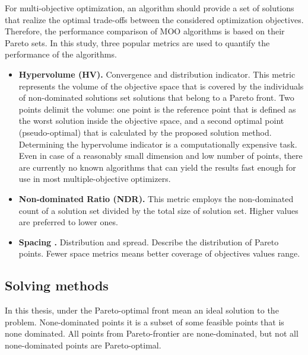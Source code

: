         For multi-objective optimization, an algorithm should provide a set of solutions that realize the optimal trade-offs between the considered optimization objectives. Therefore, the performance comparison of MOO algorithms is based on their Pareto sets. In this study, three popular metrics are used to quantify the performance of the algorithms.
        \begin{itemize}
            \item \textbf{Hypervolume (HV)\cite{Zitzler2000ComparisonOM}.} Convergence and distribution indicator.
            This metric represents the volume of the objective space that is covered by the individuals of non-dominated solutions set solutions that belong to a Pareto front. Two points delimit the volume: one point is the reference point that is defined as the worst solution inside the objective space, and a second optimal point (pseudo-optimal) that is calculated by the proposed solution method. Determining the hypervolume indicator is a computationally expensive task. Even in case of a reasonably small dimension and low number of points, there are currently no known algorithms that can yield the results fast enough for use in most multiple-objective optimizers.
            \item \textbf{Non-dominated Ratio (NDR).} This metric employs the non-dominated count of a solution set divided by the total size of solution set. Higher values are preferred to lower ones.
            \item \textbf{Spacing \cite{Schott1995FaultTD}.} Distribution and spread. Describe the distribution of Pareto points. Fewer space metrics means better coverage of objectives values range. 
            
        \end{itemize}

        \subsection{Solving methods}
        In this thesis, under the Pareto-optimal front mean an ideal solution to the problem. None-dominated points it is a subset of some feasible points that is none dominated. All points from Pareto-frontier are none-dominated, but not all none-dominated points are Pareto-optimal.

